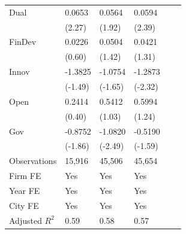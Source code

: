 \begin{table}[htbp]
\begin{tabularx}{\textwidth}{lYYYYY@{}}
Dual            &   0.0653\sym{**} &   0.0564\sym{*}  &   0.0594\sym{**} \\
                &   (2.27)         &   (1.92)         &   (2.39)         \\
FinDev          &   0.0226         &   0.0504         &   0.0421         \\
                &   (0.60)         &   (1.42)         &   (1.31)         \\
Innov           &  -1.3825         &  -1.0754\sym{*}  &  -1.2873\sym{**} \\
                &  (-1.49)         &  (-1.65)         &  (-2.32)         \\
Open            &   0.2414         &   0.5412         &   0.5994         \\
                &   (0.40)         &   (1.03)         &   (1.24)         \\
Gov             &  -0.8752\sym{*}  &  -1.0820\sym{**} &  -0.5190         \\
                &  (-1.86)         &  (-2.49)         &  (-1.59)         \\
\hline
Observations    &   15,916         &   45,506         &   45,654         \\
Firm FE         &      Yes         &      Yes         &      Yes         \\
Year FE         &      Yes         &      Yes         &      Yes         \\
City FE         &       Yes           &     Yes             &      Yes            \\
Adjusted $ R^2$ &     0.59         &     0.58         &     0.57         \\
\end{tabularx}


\end{table}
